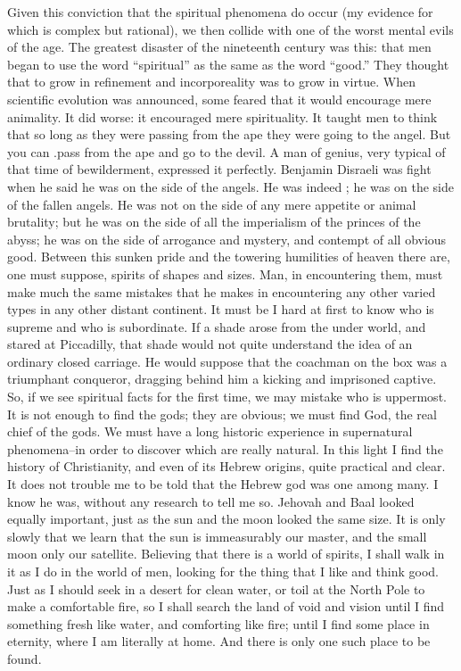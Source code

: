 \documentclass{book}
\begin{document}
Given this conviction that the spiritual phenomena do occur (my evidence for which is complex but rational), we then collide with one of the worst mental evils of the age. The greatest disaster of the nineteenth century was this: that men began to use the word “spiritual” as the same as the word “good.” They thought that to grow in refinement and incorporeality was to grow in virtue. When scientific evolution was announced, some feared that it would encourage mere animality. It did worse: it encouraged mere spirituality. It taught men to think that so long as they were passing from the ape they were going to the angel. But you can .pass from the ape and go to the devil. A man of genius, very typical of that time of bewilderment, expressed it perfectly. Benjamin Disraeli was fight when he said he was on the side of the angels. He was indeed ; he was on the side of the fallen angels. He was not on the side of any mere appetite or animal brutality; but he was on the side of all the imperialism of the princes of the abyss; he was on the side of arrogance and mystery, and contempt of all obvious good. Between this sunken pride and the towering humilities of heaven there are, one must suppose, spirits of shapes and sizes. Man, in encountering them, must make much the same mistakes that he makes in encountering any other varied types in any other distant continent. It must be I hard at first to know who is supreme and who is subordinate. If a shade arose from the under world, and stared at Piccadilly, that shade would not quite understand the idea of an ordinary closed carriage. He would suppose that the coachman on the box was a triumphant conqueror, dragging behind him a kicking and imprisoned captive. So, if we see spiritual facts for the first time, we may mistake who is uppermost. It is not enough to find the gods; they are obvious; we must find God, the real chief of the gods. We must have a long historic experience in supernatural phenomena–in order to discover which are really natural. In this light I find the history of Christianity, and even of its Hebrew origins, quite practical and clear. It does not trouble me to be told that the Hebrew god was one among many. I know he was, without any research to tell me so. Jehovah and Baal looked equally important, just as the sun and the moon looked the same size. It is only slowly that we learn that the sun is immeasurably our master, and the small moon only our satellite. Believing that there is a world of spirits, I shall walk in it as I do in the world of men, looking for the thing that I like and think good. Just as I should seek in a desert for clean water, or toil at the North Pole to make a comfortable fire, so I shall search the land of void and vision until I find something fresh like water, and comforting like fire; until I find some place in eternity, where I am literally at home. And there is only one such place to be found.
\end{document}
